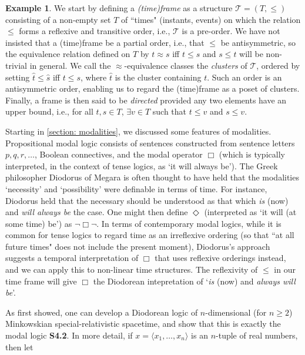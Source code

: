 \documentclass[a4paper]{book}
\theoremstyle{definition}
\newtheorem{example}{Example}[section]
\theoremstyle{definition}
\theoremstyle{definition}
\theoremstyle{theorem}
\theoremstyle{definition}
\begin{document}
\begin{example}
	We start by defining a \textit{(time)frame} as a structure $\mathcal{T} = (T, \leq)$ consisting of a non-empty set $T$ of ``times" (instants, events) on which the relation $\leq$ forms a reflexive and transitive order, i.e., $\mathcal{T}$ is a pre-order. We have not insisted that a (time)frame be a partial order, i.e., that $\leq$ be antisymmetric, so the equivalence relation defined on $T$ by $t \approx s$ iff $t \leq s$ and $s \leq t$ will be non-trivial in general. We call the $\approx$-equivalence classes the \textit{clusters} of $\mathcal{T}$, ordered by setting $\hat{t} \leq \hat{s}$ iff $t \leq s$, where $\hat{t}$ is the cluster containing $t$. Such an order is an antisymmetric order, enabling us to regard the (time)frame as a poset of clusters. Finally, a frame is then said to be \textit{directed} provided any two elements have an upper bound, i.e., for all $t, s \in T$, $\exists v \in T$ such that $t \leq v$ and $s \leq v$. \par 
	Starting in \ref{section: modalities}, we discussed some features of modalities. Propositional modal logic consists of sentences constructed from sentence letters $p, q, r, \dots$, Boolean connectives, and the modal operator $\Box$ (which is typically interpreted, in the context of tense logics, as `it will always be'). The Greek philosopher Diodorus of Megara is often thought to have held that the modalities `necessity' and `possibility' were definable in terms of time. For instance, Diodorus held that the necessary should be understood as that which \textit{is} (now) and \textit{will always be} the case. One might then define $\Diamond$ (interpreted as `it will (at some time) be') as $\neg \Box \neg$. In terms of contemporary modal logics, while it is common for tense logics to regard time as an irreflexive ordering (so that ``at all future times" does not include the present moment), Diodorus's approach suggests a temporal interpretation of $\Box$ that uses reflexive orderings instead, and we can apply this to non-linear time structures. The reflexivity of $\leq$ in our time frame will give $\Box$ the Diodorean intepretation of `\textit{is} (now) and \textit{always will be}'.  \par 
	As \cite{goldblatt_diodorean_1980} first showed, one can develop a Diodorean logic of $n$-dimensional (for $n \geq 2$) Minkowskian special-relativistic spacetime, and show that this is exactly the modal logic \textbf{S4.2}. In more detail, if $x = \langle x_1, \dots, x_n \rangle$ is an $n$-tuple of real numbers, then let 

\end{example}
\end{document}
